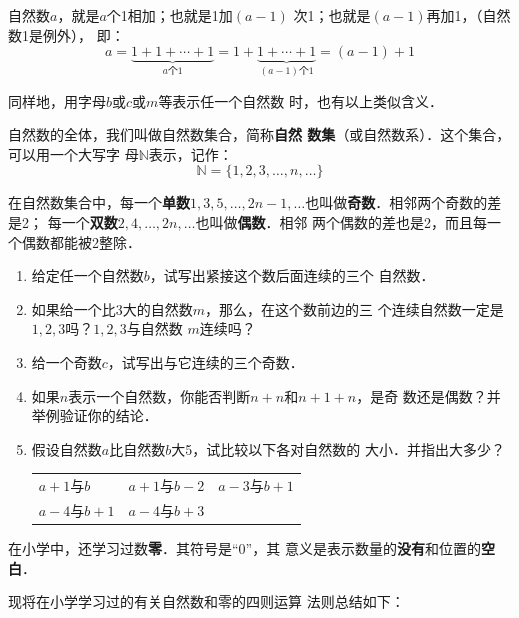 自然数$a$，就是$a$个1相加；也就是1加$(a- 1)$
次1；也就是$(a-1)$再加1，（自然数1是例外），
即：
\[a=\underbrace{1+1+\cdots+1}_{a\text{个} 1}=1+\underbrace{1+\cdots+1}_{(a-1)\text{个} 1} = (a-1)+1\]

同样地，用字母$b$或$c$或$m$等表示任一个自然数
时，也有以上类似含义．

自然数的全体，我们叫做自然数集合，简称\textbf{自然
	数集}（或自然数系）．这个集合，可以用一个大写字
母$\mathbb{N}$表示，记作：
\[\mathbb{N}=\{1,2,3,\ldots,n,\ldots \} \]

在自然数集合中，每一个\textbf{单数}$1, 3, 5,\ldots, 2n-1,\ldots$也叫做\textbf{奇数}．相邻两个奇数的差是2；
每一个\textbf{双数}$2 ,  4 , \ldots,  2n,\ldots$也叫做\textbf{偶数}．相邻
两个偶数的差也是2，而且每一个偶数都能被2整除．

\begin{ex}
	\begin{enumerate}
		\item  给定任一个自然数$b$，试写出紧接这个数后面连续的三个
		自然数．
		\item  如果给一个比3大的自然数$m$，那么，在这个数前边的三
		个连续自然数一定是$1,  2,  3$吗？$1,  2,  3$与自然数
		$m$连续吗？
		\item  给一个奇数$c$，试写出与它连续的三个奇数．
		\item  如果$n$表示一个自然数，你能否判断$n+n$和$n+1+n$，是奇
		数还是偶数？并举例验证你的结论．
		\item 假设自然数$a$比自然数$b$大5，试比较以下各对自然数的
		大小．并指出大多少？
		\begin{center}
			\begin{tabular}{p{.2\textwidth}p{}p{}}
				$a+1$与$b$&
				$a + 1$与$b-2$&
				$a-3$与$b + 1$\\
				$a-4$与$b+1$&
				$a-4$与$b+ 3$\\
			\end{tabular}
		\end{center}
		
	\end{enumerate}  
\end{ex}

在小学中，还学习过数\textbf{零}．其符号是“0”，其
意义是表示数量的\textbf{没有}和位置的\textbf{空白}．

现将在小学学习过的有关自然数和零的四则运算
法则总结如下：

